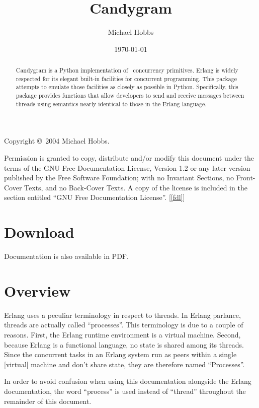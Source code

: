 \documentclass{howto}
\title{Candygram}
\date{\today}
\author{Michael Hobbs}
\newcommand{\Erlang}{\ulink{Erlang}{http://www.erlang.org/}}
\begin{document}
\maketitle

Copyright \copyright\ 2004 Michael Hobbs.

Permission is granted to copy, distribute and/or modify this document
under the terms of the GNU Free Documentation License, Version 1.2
or any later version published by the Free Software Foundation;
with no Invariant Sections, no Front-Cover Texts, and no Back-Cover Texts.
A copy of the license is included in the section entitled ``GNU
Free Documentation License''. [\ref{fdl}]

\begin{abstract}
\noindent
Candygram is a Python implementation of \Erlang\ concurrency primitives. Erlang
is widely respected for its elegant built-in facilities for concurrent
programming. This package attempts to emulate those facilities as closely as
possible in Python. Specifically, this package provides functions that allow
developers to send and receive messages between threads using semantics nearly
identical to those in the Erlang language.
\end{abstract}

\tableofcontents



\section{Download}


Documentation is also available in PDF.



\section{Overview}

\begin{notice}[note]
Erlang uses a peculiar terminology in respect to threads. In Erlang parlance,
threads are actually called ``processes''. This terminology is due to a couple
of reasons. First, the Erlang runtime environment is a virtual machine. Second,
because Erlang is a functional language, no state is shared among its threads.
Since the concurrent tasks in an Erlang system run as peers within a single
[virtual] machine and don't share state, they are therefore named ``Processes''.

In order to avoid confusion when using this documentation alongside the Erlang
documentation, the word ``process'' is used instead of ``thread'' throughout the
remainder of this document.
\end{notice}
\end{document}
